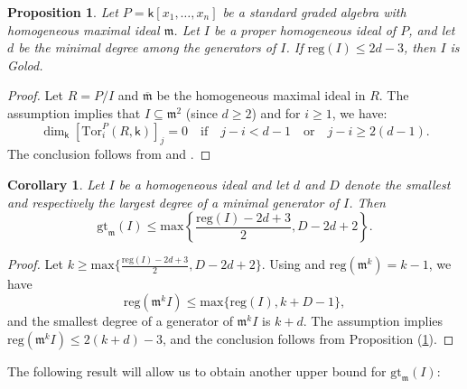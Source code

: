 \documentclass[10pt,reqno]{amsart}
\newtheorem{proposition}[subsection]{Proposition}
\newtheorem{corollary}[subsection]{Corollary}
\theoremstyle{definition}
\theoremstyle{remark}
\numberwithin{equation}{section}
\newcommand{\Tor}{\mathrm{Tor}}
\newcommand{\reg}{\mathrm{reg}}
\newcommand{\kk}{\mathsf k}
\newcommand{\m}{\mathfrak m}
\numberwithin{equation}{section}
\begin{document}
\begin{proposition}\label{huneke}
    Let $P=\kk[x_1,\ldots,x_n]$ be a standard graded algebra with homogeneous maximal ideal $\m$. Let $I$ be a proper homogeneous ideal of $P$, and let $d$ be the minimal degree among the generators of $I$. If $ \reg(I)\leq 2d-3$, then $I$ is Golod. 
\end{proposition}
\begin{proof}
    Let $R=P/I$ and $\overline{\m}$ be the homogeneous maximal ideal in $R$. The assumption implies that $I\subseteq \m^2$ (since $d\ge 2$) and for $i\geq 1$, we have: \[
    \dim_{\kk}[\Tor_{i}^P(R,\kk)]_j=0 \quad\text{if}\quad j-i<d-1 \quad\text{or}\quad j-i\geq 2(d-1).
    \] 
    The conclusion follows from \cite[Lemma 9.4]{diethorn2026homological} and \cite[Proposition 9.3]{diethorn2026homological}.
\end{proof}


\begin{corollary}\label{another bound}
Let $I$ be a homogeneous ideal and let $d$ and $D$ denote the smallest and respectively the largest degree of a minimal generator of $I$. Then $$\mathrm{gt}_{\m}(I) \le \mathrm{max}\left\{\dfrac{\mathrm{reg}(I)-2d+3}{2}, D-2d+2\right\}.$$
\end{corollary}
\begin{proof}
Let $k\ge \mathrm{max}\{\frac{\mathrm{reg}(I)-2d+3}{2}, D-2d+2\}$. 
Using \cite[Corollary 7.5]{eisenbud2006regularity} and $\reg(\m^k)=k-1$, we have $$\mathrm{reg}(\m^kI)\le \mathrm{max}\{\mathrm{reg}(I), k+D-1\}, 
$$
and the smallest degree of a generator of $\m^kI$ is $k+d$. The assumption implies 
$\mathrm{reg}(\m^kI)\le 2(k+d)-3$, and the conclusion follows from Proposition (\ref{huneke}).
\end{proof}

The following result will allow us to obtain another upper bound for $\mathrm{gt}_{\m}(I)$:
\end{document}

